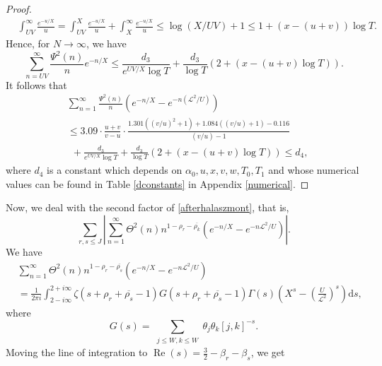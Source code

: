 \documentclass[reqno]{amsart}
\numberwithin{equation}{section}
\theoremstyle{remark}
\begin{document}
\begin{proof}
\begin{equation*}
\begin{aligned}
            &\int_{UV}^\infty\frac{e^{-u/X}}{u}=\int_{UV}^X\frac{e^{-u/X}}{u}+\int_{X}^\infty\frac{e^{-u/X}}{u}\le \log(X/UV)+1\le 1+(x-(u+v))\log T.
        \end{aligned}
    \end{equation*}
    Hence, for $N\rightarrow\infty$, we have
    \begin{equation*}
         \sum_{n=UV}^{\infty}\frac{\Psi^2(n)}{n}e^{-n/X}\le \frac{d_3}{e^{UV/X}\log T }+\frac{d_3}{\log T}\left(2+(x-(u+v)\log T)\right).
    \end{equation*}
It follows that
\begin{equation*}
    \begin{aligned}
        & \sum_{n=1}^{\infty}\frac{\Psi^2(n)}{n}(e^{-n/X}-e^{-n(\mathscr{L}^2/U)})\\&\le  3.09\cdot \frac{u+v}{v-u}\cdot \frac{1.301((v/u)^2+1)+1.084((v/u)+1)-0.116}{(v/u)-1}\\&\ \ +\frac{d_3}{e^{UV/X}\log T}+\frac{d_3}{\log T}\left(2+(x-(u+v)\log T)\right)\le d_4,
    \end{aligned}
\end{equation*}
where $d_4$ is a constant which depends on $\alpha_0,u,x,v,w,T_0,T_1$ and whose numerical values can be found in Table \ref{dconstants} in Appendix \ref{numerical}.
\end{proof}
Now, we deal with the second factor of \eqref{afterhalaszmont}, that is,
\[
\sum_{r,s\le J}\left|\sum_{n=1}^\infty\Theta^2(n)n^{1-\rho_r-\overline{\rho_k}}(e^{-n/X}-e^{-n\mathcal{L}^2/U})\right|.
\]
We have
\begin{equation*}
    \begin{aligned}
     &\sum_{n=1}^\infty\Theta^2(n)n^{1-\rho_r-\overline{\rho_s}}(e^{-n/X}-e^{-n\mathcal{L}^2/U})\\&=\frac{1}{2\pi i}\int_{2-i\infty}^{2+i\infty}\zeta\left(s+\rho_{r}+\overline{\rho_s}-1\right)G\left(s+\rho_r+\overline{\rho_s}-1\right)\Gamma(s)\left(X^s-\left(\frac{U}{\mathcal{L}^2}\right)^s\right)\text{d}s,   
    \end{aligned}
\end{equation*}
where
\begin{equation}\label{defGs}
G(s)=\sum_{\substack{j \leq W, k \leq W}} \theta_j \theta_k[j, k]^{-s}.
\end{equation}
Moving the line of integration to $\operatorname{Re}(s)=\frac{3}{2}-\beta_r-\beta_s$, we get
\end{document}
